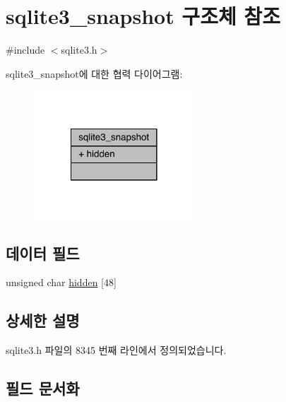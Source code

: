 \hypertarget{structsqlite3__snapshot}{}\section{sqlite3\+\_\+snapshot 구조체 참조}
\label{structsqlite3__snapshot}


{\ttfamily \#include $<$sqlite3.\+h$>$}



sqlite3\+\_\+snapshot에 대한 협력 다이어그램\+:
\nopagebreak
\begin{figure}[H]
\begin{center}
\leavevmode
\includegraphics[width=170pt]{d7/d46/structsqlite3__snapshot__coll__graph}
\end{center}
\end{figure}
\subsection*{데이터 필드}
\begin{DoxyCompactItemize}
\item 
unsigned char \hyperlink{structsqlite3__snapshot_aeed328b50a9580e9a91d0bf10612be4e}{hidden} \mbox{[}48\mbox{]}
\end{DoxyCompactItemize}


\subsection{상세한 설명}


sqlite3.\+h 파일의 8345 번째 라인에서 정의되었습니다.



\subsection{필드 문서화}
\mbox{\label{structsqlite3__snapshot_aeed328b50a9580e9a91d0bf10612be4e}} 

